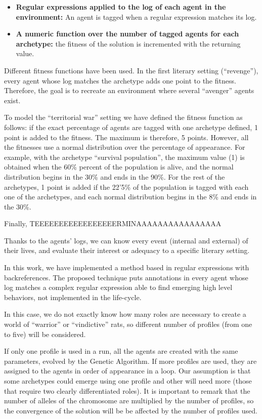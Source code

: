 \documentclass[letterpaper]{article}
\begin{document}
\begin{itemize}
\item \textbf{Regular expressions applied to the log of each agent in the environment:} An agent is tagged when a regular expression matches its log.
\item \textbf{A numeric function over the number of tagged agents for each archetype:} the fitness of the solution is incremented with the returning value.
\end{itemize}

Different fitness functions have been used. In the first literary setting (``revenge''), every agent whose log matches the archetype adds one point to the fitness. Therefore, the goal is to recreate an environment where several ``avenger'' agents exist.

To model the ``territorial war'' setting we have defined the fitness function as follows: if the exact percentage of agents are tagged with one archetype defined, 1 point is added to the fitness. The maximum is therefore, 5 points. However, all the fitnesses use a normal distribution over the percentage of appearance. For example, with the archetype ``survival population'', the maximum value (1) is obtained when the 60\% percent of the population is alive, and the normal distribution begins in the 30\% and ends in the 90\%. For the rest of the archetypes, 1 point is added if the 22'5\% of the population is tagged with each one of the archetypes, and each normal distribution begins in the 8\% and ends in the 30\%.

Finally, TEEEEEEEEEEEEEEEEERMINAAAAAAAAAAAAAAAA


Thanks to the agents' logs, we can know every event (internal and
external) of their lives, and evaluate their interest or
adequacy to a specific literary setting.

In this work, we have implemented a method based in regular expressions with backreferences. The proposed technique puts annotations in every agent whose log matches a complex regular expression able to find emerging high level behaviors, not implemented in the life-cycle.




In this case,
 we do not exactly know how many roles are necessary to create a world of ``warrior'' or ``vindictive''
  rats, so different number of profiles (from one to five) will be considered.




If only one profile is used
in a run, all the agents are created with the same parameters, evolved
by the Genetic Algorithm. If more profiles are used, they are assigned
to the agents in order of appearance in a loop. Our assumption is that
some archetypes could emerge using one profile and other will need
more (those that require two clearly differentiated roles). It is
important to remark that the number of alleles of the chromosome are
multiplied by the number of profiles, so the convergence of the
solution will be be affected by the number of profiles used.
\end{document}
